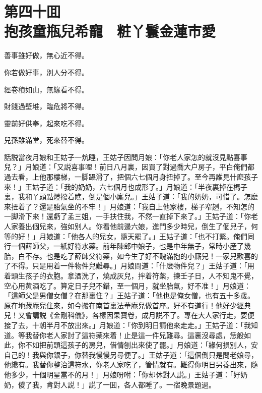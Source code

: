 
\chapter*{第四十囬　\\抱孩童瓶兒希寵　粧丫鬟金蓮市愛}


\begin{myquote}
善事雖好做，無心近不得。

你若做好事，別人分不得。

經卷積如山，無緣看不得。

財錢過壁堆，臨危將不得。

靈前好供奉，起來吃不得。

兒孫雖滿堂，死來替不得。
\end{myquote}

話説當夜月娘和王姑子一炕睡，王姑子因問月娘：「你老人家怎的就沒見點喜事兒？」月娘道：「又説喜事哩！前日八月裏，因買了對過喬大户房子，平白俺們都過去看，上他那樓梯，一脚躡滑了，把個六七個月身扭掉了。至今再誰見什麽孩子來！」王姑子道：「我的奶奶，六七個月也成形了。」月娘道：「半夜裏掉在榪子裏，我和丫頭點燈撥着瞧，倒是個小廝兒。」王姑子道：「我的奶奶，可惜了。怎麽來扭着了？還是胎氣坐的不牢！」月娘道：「我自上他家樓，梯子窄趔，不知怎的一脚滑下來！還虧了孟三姐，一手扶住我，不然一直掉下來了。」王姑子道：「你老人家養出個兒來，強如别人。你看他前邊六娘，進門多少時兒，倒生了個兒子，何等的好！」月娘道：「他各人的兒女，隨天罷了。」王姑子道：「也不打緊。俺們同行一個薛師父，一紙好符水薬。前年陳郎中娘子，也是中年無子，常時小産了幾胎，白不存。也是吃了薛師父符薬，如今生了好不醜滿抱的小廝兒！一家兒歡喜的了不得。只是用着一件物件兒難尋。」月娘問道：「什麽物件兒？」王姑子道：「用着頭生孩子的衣胞。拿酒洗了，燒成灰兒，拌着符薬，揀壬子日，人不知鬼不覺，空心用黄酒吃了。算定日子兒不錯，至一個月，就坐胎氣，好不准！」月娘道：「這師父是男僧女僧？在那裏住？」王姑子道：「他也是俺女僧，也有五十多歲。原在地藏庵兒住來，如今搬在南首裏法華庵兒做首座。好不有道行！他好少經典兒！又會講説《金剛科儀》，各樣因果寳卷，成月説不了。專在大人家行走，要便接了去，十朝半月不放出來。」月娘道：「你到明日請他來走走。」王姑子道：「我知道。等我替你老人家討了這符薬來着！止是這一件兒難尋。這裏沒尋處，恁般如此，你不如把前頭這孩子的房兒，借情刨出來使了罷。」月娘道：「緣何損別人，安自己的！我與你銀子，你替我慢慢另尋便了。」王姑子道：「這個倒只是問老娘尋，他纔有。我替你整治這符水，你老人家吃了，管情就有。難得你明日另養出來，隨他多少，十個明星當不的月！」月娘吩咐：「你却休對人説。」王姑子道：「好奶奶，儍了我，肯對人説！」説了一囬，各人都睡了。一宿晚景題過。

